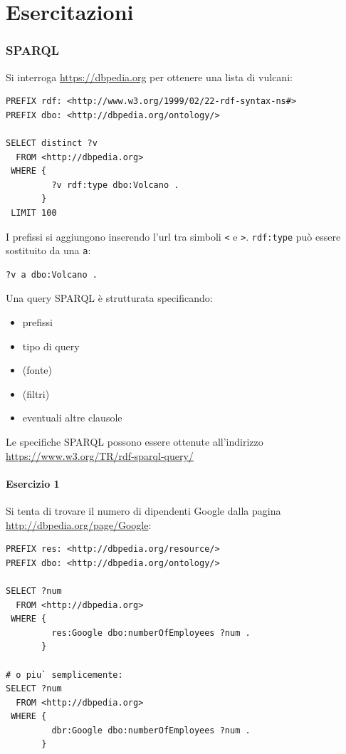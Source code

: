 \documentclass[11pt]{article}
\begin{document}
\part{Esercitazioni}

\section{SPARQL}
Si interroga \url{https://dbpedia.org} per ottenere una lista di vulcani:
\begin{lstlisting}[language=sparql]
PREFIX rdf: <http://www.w3.org/1999/02/22-rdf-syntax-ns#>
PREFIX dbo: <http://dbpedia.org/ontology/>

SELECT distinct ?v
  FROM <http://dbpedia.org>
 WHERE {
         ?v rdf:type dbo:Volcano .
       }
 LIMIT 100
\end{lstlisting}
I prefissi si aggiungono inserendo l'url tra simboli \verb|<| e \verb|>|.
\verb|rdf:type| può essere sostituito da una \verb|a|:
\begin{lstlisting}[language=sparql]
?v a dbo:Volcano .
\end{lstlisting}

Una query SPARQL è strutturata specificando:
\begin{itemize}
  \item prefissi
  \item tipo di query
  \item (fonte)
  \item (filtri)
  \item eventuali altre clausole
\end{itemize}
Le specifiche SPARQL possono essere ottenute all'indirizzo \url{https://www.w3.org/TR/rdf-sparql-query/}

\subsection*{Esercizio 1}
Si tenta di trovare il numero di dipendenti Google dalla pagina \url{http://dbpedia.org/page/Google}:
\begin{lstlisting}[language=sparql]
PREFIX res: <http://dbpedia.org/resource/>
PREFIX dbo: <http://dbpedia.org/ontology/>

SELECT ?num
  FROM <http://dbpedia.org>
 WHERE {
         res:Google dbo:numberOfEmployees ?num .
       }

# o piu` semplicemente:
SELECT ?num
  FROM <http://dbpedia.org>
 WHERE {
         dbr:Google dbo:numberOfEmployees ?num .
       }
\end{lstlisting}
\end{document}
